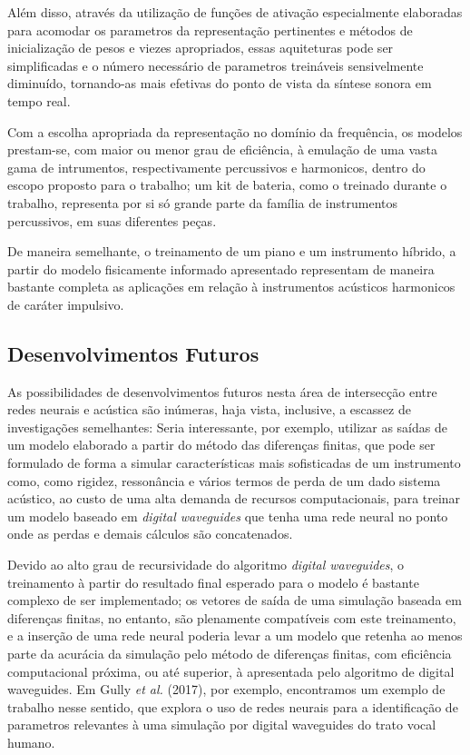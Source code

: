\documentclass[]{article}
\begin{document}
Além disso, através da utilização de funções de ativação especialmente
elaboradas para acomodar os parametros da representação pertinentes e
métodos de inicialização de pesos e viezes apropriados, essas
aquiteturas pode ser simplificadas e o número necessário de parametros
treináveis sensivelmente diminuído, tornando-as mais efetivas do ponto
de vista da síntese sonora em tempo real.

Com a escolha apropriada da representação no domínio da frequência, os
modelos prestam-se, com maior ou menor grau de eficiência, à emulação de
uma vasta gama de intrumentos, respectivamente percussivos e harmonicos,
dentro do escopo proposto para o trabalho; um kit de bateria, como o
treinado durante o trabalho, representa por si só grande parte da
família de instrumentos percussivos, em suas diferentes peças.

De maneira semelhante, o treinamento de um piano e um instrumento
híbrido, a partir do modelo fisicamente informado apresentado
representam de maneira bastante completa as aplicações em relação à
instrumentos acústicos harmonicos de caráter impulsivo.

\hypertarget{desenvolvimentos-futuros}{%
\subsection{Desenvolvimentos Futuros}\label{desenvolvimentos-futuros}}

As possibilidades de desenvolvimentos futuros nesta área de intersecção
entre redes neurais e acústica são inúmeras, haja vista, inclusive, a
escassez de investigações semelhantes: Seria interessante, por exemplo,
utilizar as saídas de um modelo elaborado a partir do método das
diferenças finitas, que pode ser formulado de forma a simular
características mais sofisticadas de um instrumento como, como rigidez,
ressonância e vários termos de perda de um dado sistema acústico, ao
custo de uma alta demanda de recursos computacionais, para treinar um
modelo baseado em \emph{digital waveguides} que tenha uma rede neural no
ponto onde as perdas e demais cálculos são concatenados.

Devido ao alto grau de recursividade do algoritmo \emph{digital
waveguides}, o treinamento à partir do resultado final esperado para o
modelo é bastante complexo de ser implementado; os vetores de saída de
uma simulação baseada em diferenças finitas, no entanto, são plenamente
compatíveis com este treinamento, e a inserção de uma rede neural
poderia levar a um modelo que retenha ao menos parte da acurácia da
simulação pelo método de diferenças finitas, com eficiência
computacional próxima, ou até superior, à apresentada pelo algoritmo de
digital waveguides. Em Gully \emph{et al.} (2017), por exemplo,
encontramos um exemplo de trabalho nesse sentido, que explora o uso de
redes neurais para a identificação de parametros relevantes à uma
simulação por digital waveguides do trato vocal humano.
\end{document}
